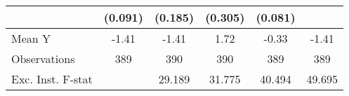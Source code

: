 {\begin{tabular}{l*{5}{c}}
            &     (0.091)         &     (0.185)         &     (0.305)         &     (0.081)         &                     \\
\midrule
Mean Y      &       -1.41         &       -1.41         &        1.72         &       -0.33         &       -1.41         \\
Observations&         389         &         390         &         390         &         389         &         389         \\
Exc. Inst. F-stat&                     &      29.189         &      31.775         &      40.494         &      49.695         \\
\bottomrule
\end{tabular}
}
